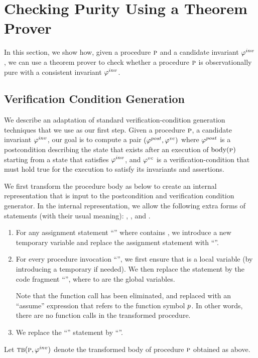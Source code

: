 \newcommand{\existformula}{\psi^e}
\newcommand{\EA}{\textsc{ea}}
\newcommand{\IW}{\textsc{iw}}

\newcommand{\initformula}{\logicalformula{init}}

\section{Checking Purity Using a Theorem Prover}
\label{sec:vcgen}

In this section, we show how, given a procedure $\textsc{p}$ and a candidate invariant $\varphi^{inv}$, we can use a theorem prover
to check whether a procedure $\textsc{p}$ is observationally pure with a consistent invariant $\varphi^{inv}$.



\subsection{Verification Condition Generation}

We describe an adaptation of standard verification-condition generation techniques that we use as our first step.
Given a procedure $\textsc{p}$, a candidate invariant $\varphi^{inv}$, our goal is to compute a
pair $(\varphi^{post},\varphi^{vc})$ where $\varphi^{post}$ is a postcondition describing the state that exists after an execution of
$\text{body}(\textsc{p})$ starting from a state that satisfies $\varphi^{inv}$, and $\varphi^{vc}$ is a verification-condition that must hold true
for the execution to satisfy its invariants and assertions.

We first transform the procedure body as below to create an internal representation that is input to the
postcondition and verification condition generator. In the internal representation, we allow the following
extra forms of statements (with their usual meaning): , , and  .
\begin{enumerate}
\item For any assignment statement ``'' where  contains , we introduce a new temporary
variable  and replace the assignment statement with ``''.
\item For every procedure invocation ``'', we first ensure that  is a local variable (by introducing
a temporary if needed). We then replace the statement by the code fragment
``'',
where  to  are the global variables.

Note that the
function call has been eliminated, and replaced with an ``assume''
expression that refers to the function symbol $p$. In other words,
there are no function calls in the transformed procedure.
\item We replace the ``'' statement by ``''.
\end{enumerate}
Let $\textsc{tb}(\textsc{p}, \varphi^{inv})$ denote the transformed body of procedure $\textsc{p}$ obtained as above.

